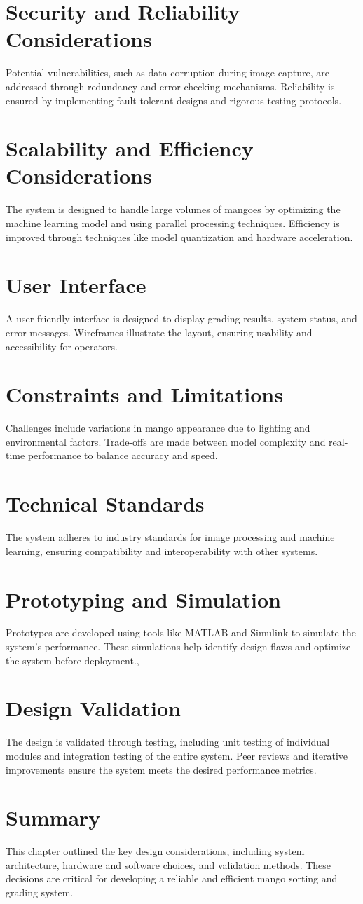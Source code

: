 \section{Security and Reliability Considerations}
Potential vulnerabilities, such as data corruption during image capture, are addressed through redundancy and error-checking mechanisms. Reliability is ensured by implementing fault-tolerant designs and rigorous testing protocols.
\section{Scalability and Efficiency Considerations}
The system is designed to handle large volumes of mangoes by optimizing the machine learning model and using parallel processing techniques. Efficiency is improved through techniques like model quantization and hardware acceleration.
\section{User Interface}
A user-friendly interface is designed to display grading results, system status, and error messages. Wireframes illustrate the layout, ensuring usability and accessibility for operators.
\section{Constraints and Limitations}
Challenges include variations in mango appearance due to lighting and environmental factors. Trade-offs are made between model complexity and real-time performance to balance accuracy and speed.
\section{Technical Standards}
The system adheres to industry standards for image processing and machine learning, ensuring compatibility and interoperability with other systems.
\section{Prototyping and Simulation}
Prototypes are developed using tools like MATLAB and Simulink to simulate the system’s performance. These simulations help identify design flaws and optimize the system before deployment.,
\section{Design Validation}
The design is validated through testing, including unit testing of individual modules and integration testing of the entire system. Peer reviews and iterative improvements ensure the system meets the desired performance metrics.
\section{Summary}
This chapter outlined the key design considerations, including system architecture, hardware and software choices, and validation methods. These decisions are critical for developing a reliable and efficient mango sorting and grading system.

